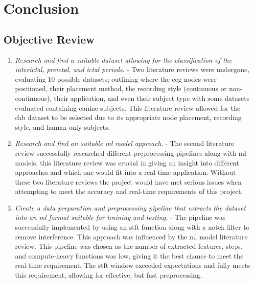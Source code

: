 \documentclass[12pt]{article}
\begin{document}
\section{Conclusion}

\subsection{Objective Review}


\begin{enumerate}
\item \textit{Research and find a suitable dataset allowing for the classification of the interictal, preictal, and ictal periods.} - Two literature reviews were undergone, evaluating 10 possible datasets; outlining where the \acrshort{eeg} nodes were positioned, their placement method, the recording style (continuous or non-continuous), their application, and even their subject type with some datasets evaluated containing canine subjects. This literature review allowed for the \acrshort{chb} dataset to be selected due to its appropriate node placement, recording style, and human-only subjects.
	
	
\item \textit{Research and find an suitable \acrshort{ml} model approach.} - The second literature review successfully researched different preprocessing pipelines along with \acrshort{ml} models, this literature review was crucial in giving an insight into different approaches and which one would fit into a real-time application. Without these two literature reviews the project would have met serious issues when attempting to meet the accuracy and real-time requirements of this project.
	
	
\item \textit{Create a data preparation and preprocessing pipeline that extracts the dataset into an \acrshort{ml} format suitable for training and testing. } - The pipeline was successfully implemented by using an \acrshort{stft} function along with a notch filter to remove interference. This approach was influenced by the \acrshort{ml} model literature review. This pipeline was chosen as the number of extracted features, steps, and compute-heavy functions was low, giving it the best chance to meet the real-time requirement. The \acrshort{stft} window exceeded expectations and fully meets this requirement, allowing for effective, but fast preprocessing.
        

\end{enumerate}
\end{document}
